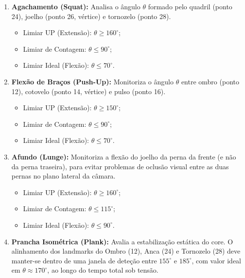 \begin{enumerate}
    \item \textbf{Agachamento (Squat):} Analisa o ângulo $\theta$ formado pelo quadril (ponto 24), joelho (ponto 26, vértice) e tornozelo (ponto 28).
        \begin{itemize}
            \item Limiar UP (Extensão): $\theta \ge 160^\circ$;
            \item Limiar de Contagem: $\theta \le 90^\circ$;
            \item Limiar Ideal (Flexão): $\theta \le 70^\circ$.
        \end{itemize}

    \item \textbf{Flexão de Braços (Push-Up):} Monitoriza o ângulo $\theta$ entre ombro (ponto 12), cotovelo (ponto 14, vértice) e pulso (ponto 16).
        \begin{itemize}
            \item Limiar UP (Extensão): $\theta \ge 150^\circ$;
            \item Limiar de Contagem: $\theta \le 90^\circ$;
            \item Limiar Ideal (Flexão): $\theta \le 70^\circ$.
        \end{itemize}

    \item \textbf{Afundo (Lunge):} Monitoriza a flexão do joelho da perna da frente (e não da perna traseira), para evitar problemas de oclusão visual entre as duas pernas no plano lateral da câmara.
        \begin{itemize}
            \item Limiar UP (Extensão): $\theta \ge 160^\circ$;
            \item Limiar de Contagem: $\theta \le 115^\circ$;
            \item Limiar Ideal (Flexão): $\theta \le 90^\circ$.
        \end{itemize}

    \item \textbf{Prancha Isométrica (Plank):} Avalia a estabilização estática do core. O alinhamento dos landmarks do Ombro (12), Anca (24) e Tornozelo (28) deve manter-se dentro de uma janela de deteção entre $155^\circ$ e $185^\circ$, com valor ideal em $\theta \approx 170^\circ$, ao longo do tempo total sob tensão.
\end{enumerate}

